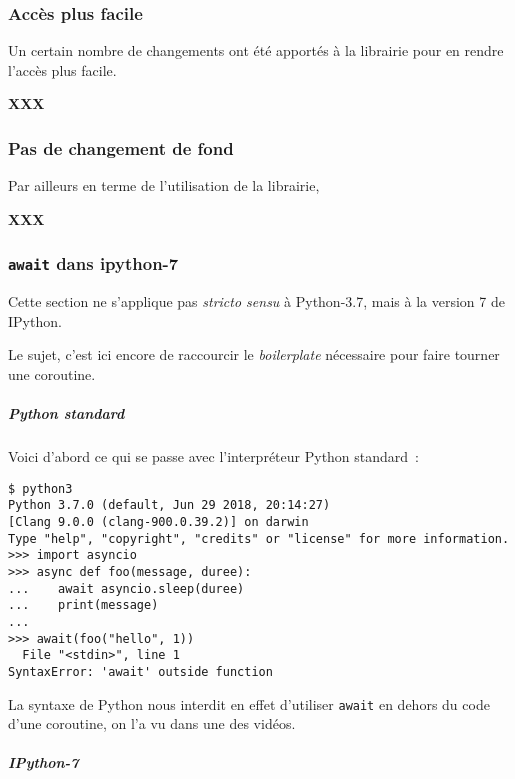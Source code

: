     \hypertarget{accuxe8s-plus-facile}{%
\subsubsection{Accès plus facile}\label{accuxe8s-plus-facile}}

    Un certain nombre de changements ont été apportés à la librairie pour en
rendre l'accès plus facile.

\textbf{XXX}

    \hypertarget{pas-de-changement-de-fond}{%
\subsubsection{Pas de changement de
fond}\label{pas-de-changement-de-fond}}

    Par ailleurs en terme de l'utilisation de la librairie,

\textbf{XXX}

    \hypertarget{await-dans-ipython-7}{%
\subsubsection{\texorpdfstring{\texttt{await} dans
ipython-7}{await dans ipython-7}}\label{await-dans-ipython-7}}

Cette section ne s'applique pas \emph{stricto sensu} à Python-3.7, mais
à la version 7 de IPython.

Le sujet, c'est ici encore de raccourcir le \emph{boilerplate}
nécessaire pour faire tourner une coroutine.

    \hypertarget{python-standard}{%
\subparagraph{Python standard}\label{python-standard}}

    Voici d'abord ce qui se passe avec l'interpréteur Python standard~:

    \begin{verbatim}
$ python3
Python 3.7.0 (default, Jun 29 2018, 20:14:27)
[Clang 9.0.0 (clang-900.0.39.2)] on darwin
Type "help", "copyright", "credits" or "license" for more information.
>>> import asyncio
>>> async def foo(message, duree):
...    await asyncio.sleep(duree)
...    print(message)
...
>>> await(foo("hello", 1))
  File "<stdin>", line 1
SyntaxError: 'await' outside function
\end{verbatim}

    La syntaxe de Python nous interdit en effet d'utiliser \texttt{await} en
dehors du code d'une coroutine, on l'a vu dans une des vidéos.

    \hypertarget{ipython-7}{%
\subparagraph{IPython-7}\label{ipython-7}}

